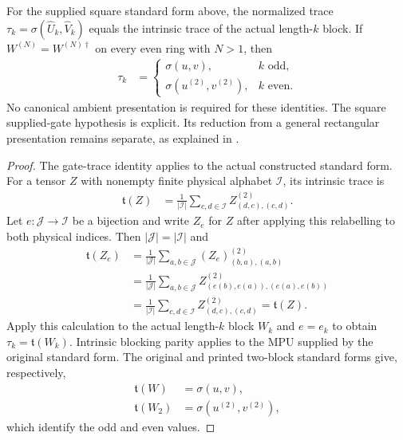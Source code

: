 \begin{lemma}
    \label{lem:mpu_actual_printed_blocking_trace_parity}
    \leanok
    For the supplied square standard form above, the normalized trace
    $\tau_k=\sigma(\widehat U_k,\widehat V_k)$ equals the intrinsic trace
    of the actual length-$k$ block. If $W^{(N)}=W^{(N)\dagger}$ on every
    even ring with $N>1$, then
    \begin{align*}
        \tau_k & =\begin{cases}
                      \sigma(u,v),             & k\text{ odd},  \\
                      \sigma(u^{(2)},v^{(2)}), & k\text{ even}.
                  \end{cases}
    \end{align*}
    No canonical ambient presentation is required for these identities.
    The square supplied-gate hypothesis is explicit. Its reduction from
    a general rectangular presentation remains separate, as explained in
    \cite{gap:mpu_printed_blocking_square_scope}.
\end{lemma}
\begin{proof}\leanok
    The gate-trace identity applies to the actual constructed standard
    form. For a tensor $Z$ with nonempty finite physical alphabet
    $\mathcal I$, its intrinsic trace is
    \begin{align*}
        \mathfrak t(Z) & =\frac{1}{|\mathcal I|}
        \sum_{c,d\in\mathcal I}Z^{(2)}_{(d,c),(c,d)}.
    \end{align*}
    Let $e:\mathcal J\to\mathcal I$ be a bijection and write $Z_e$
    for $Z$ after applying this relabelling to both physical indices.
    Then $|\mathcal J|=|\mathcal I|$ and
    \begin{align*}
        \mathfrak t(Z_e)
         & =\frac{1}{|\mathcal J|}
        \sum_{a,b\in\mathcal J}(Z_e)^{(2)}_{(b,a),(a,b)}         \\
         & =\frac{1}{|\mathcal J|}
        \sum_{a,b\in\mathcal J}Z^{(2)}_{(e(b),e(a)),(e(a),e(b))} \\
         & =\frac{1}{|\mathcal I|}
        \sum_{c,d\in\mathcal I}Z^{(2)}_{(d,c),(c,d)}
        =\mathfrak t(Z).
    \end{align*}
    Apply this calculation to the actual length-$k$ block $W_k$ and
    $e=e_k$ to obtain $\tau_k=\mathfrak t(W_k)$. Intrinsic blocking
    parity applies to the MPU supplied by the original standard form.
    The original and printed two-block standard forms give, respectively,
    \begin{align*}
        \mathfrak t(W)   & =\sigma(u,v),             \\
        \mathfrak t(W_2) & =\sigma(u^{(2)},v^{(2)}),
    \end{align*}
    which identify the odd and even values.
\end{proof}
